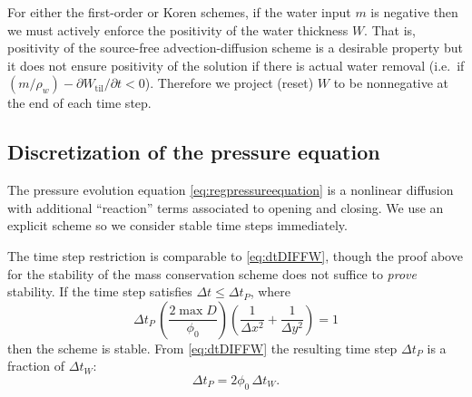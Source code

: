 \documentclass[gmd]{copernicus}   %
\newcommand{\text}{\textrm}
\newcommand{\Wtil}{W_{\text{til}}}
\begin{document}
For either the first-order or Koren schemes, if the water input $m$ is negative then we must actively enforce the positivity of the water thickness $W$.  That is, positivity of the source-free advection-diffusion scheme is a desirable property but it does not ensure positivity of the solution if there is actual water removal (i.e.~if $(m/\rho_w) - \partial \Wtil/\partial t < 0$).  Therefore we project (reset) $W$ to be nonnegative at the end of each time step.

\subsection{Discretization of the pressure equation}  The pressure evolution equation \eqref{eq:regpressureequation} is a nonlinear diffusion with additional ``reaction'' terms associated to opening and closing.  We use an explicit scheme so we consider stable time steps immediately.

The time step restriction is comparable to \eqref{eq:dtDIFFW}, though the proof above for the stability of the mass conservation scheme does not suffice to \emph{prove} stability.  If the time step satisfies $\Delta t \le \Delta t_P$, where
\begin{equation}
\Delta t_P\, \left(\frac{2 \max D}{\phi_0}\right) \left(\frac{1}{\Delta x^2} + \frac{1}{\Delta y^2}\right) = 1 \label{eq:dtDIFFP}
\end{equation}
then the scheme is stable.  From \eqref{eq:dtDIFFW} the resulting time step $\Delta t_P$ is a fraction of $\Delta t_W$:
\begin{equation}
\Delta t_P = 2 \phi_0\, \Delta t_W.  \label{eq:dtDIFFPfromW}
\end{equation}
\end{document}
